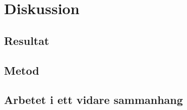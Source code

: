 \chapter{Diskussion}

\section{Resultat}

\section{Metod}

\section{Arbetet i ett vidare sammanhang}
